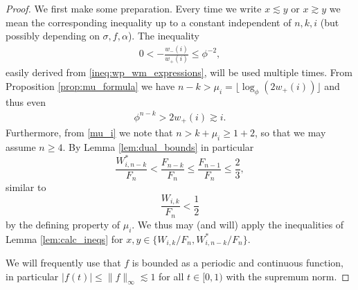 \documentclass[]{interact}
\theoremstyle{definition}
\numberwithin{table}{section} %
\numberwithin{figure}{section}
\begin{document}
\begin{proof}
    We first make some preparation. Every time we write $x \lesssim y$ or $x \gtrsim y$ we mean the corresponding inequality up to a constant independent of $n, k, i$ (but possibly depending on $\sigma, f, \alpha$). The inequality
    \begin{align} \label{ineq:quot_bound}
        0 < -\frac{w_-(i)}{w_+(i)} \leq \phi^{-2},
    \end{align}
    easily derived from \eqref{ineq:wp_wm_expressions}, will be used multiple times. From Proposition \ref{prop:mu_formula} we have $n-k > \mu_i = \lfloor \log_\phi(2 w_+(i))\rfloor$ and thus even
    \begin{align} \label{ineq:n_k_i}
        \phi^{n-k} > 2 w_+(i) \gtrsim i.
    \end{align}
    Furthermore, from \eqref{mu_i} we note that $n > k + \mu_i \geq 1+2$, so that we may assume $n \geq 4$. By Lemma \ref{lem:dual_bounds} in particular
    $$
    \frac{W_{i, n-k}^*}{F_n} < \frac{F_{n-k}}{F_n} \leq \frac{F_{n-1}}{F_n} \leq \frac23,
    $$
    similar to
    $$
    \frac{W_{i, k}}{F_n} < \frac12
    $$
    by the defining property of $\mu_i$. We thus may (and will) apply the inequalities of Lemma \ref{lem:calc_ineqs} for $x, y \in \{W_{i, k}/F_n, W_{i, n-k}^*/F_n\}$.
    
    We will frequently use that $f$ is bounded as a periodic and continuous function, in particular $|f(t)| \leq \|f\|_\infty \lesssim 1$ for all $t \in [0, 1)$ with the supremum norm.


\end{proof}
\end{document}
